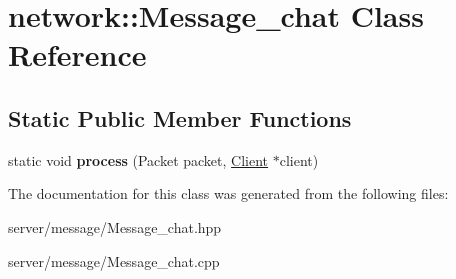 \hypertarget{classnetwork_1_1_message__chat}{\section{network\-:\-:Message\-\_\-chat Class Reference}
\label{classnetwork_1_1_message__chat}
}
\subsection*{Static Public Member Functions}
\begin{DoxyCompactItemize}
\item 
\hypertarget{classnetwork_1_1_message__chat_ae9042cda17565f8d7af8f703eea629d9}{static void {\bfseries process} (Packet packet, \hyperlink{class_client}{Client} $\ast$client)}\label{classnetwork_1_1_message__chat_ae9042cda17565f8d7af8f703eea629d9}

\end{DoxyCompactItemize}


The documentation for this class was generated from the following files\-:\begin{DoxyCompactItemize}
\item 
server/message/Message\-\_\-chat.\-hpp\item 
server/message/Message\-\_\-chat.\-cpp\end{DoxyCompactItemize}
